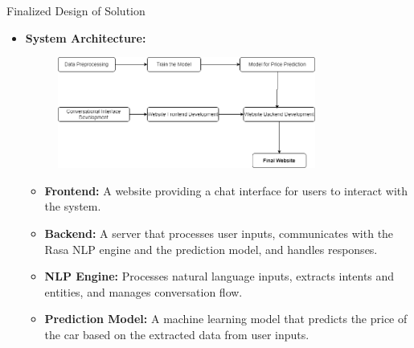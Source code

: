 \documentclass{beamer}
\begin{document}
\begin{frame}[t]{Finalized Design of Solution}
    \begin{itemize}
        \item \textbf{System Architecture:}
	\begin{figure}[htbp]
        \centering
        \includegraphics[width=0.8\textwidth]{Flowchart2.png}
    \end{figure}
        \begin{itemize}
            \item \textbf{Frontend:} A website providing a chat interface for users to interact with the system.
            \item \textbf{Backend:} A server that processes user inputs, communicates with the Rasa NLP engine and the prediction model, and handles responses.
            \item \textbf{NLP Engine:} Processes natural language inputs, extracts intents and entities, and manages conversation flow.
            \item \textbf{Prediction Model:} A machine learning model that predicts the price of the car based on the extracted data from user inputs.
        \end{itemize}
    \end{itemize}

	
\end{frame}
\end{document}
